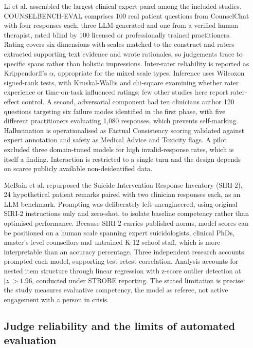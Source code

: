 \documentclass[11pt]{article}
\begin{document}
	Li et al.\cite{li2026counselbenchlargescaleexpertevaluation} assembled the largest clinical expert panel among the included studies. COUNSELBENCH-EVAL comprises 100 real patient questions from CounselChat with four responses each, three LLM-generated and one from a verified human therapist, rated blind by 100 licensed or professionally trained practitioners. Rating covers six dimensions with scales matched to the construct and raters extracted supporting text evidence and wrote rationales, so judgements trace to specific spans rather than holistic impressions. Inter-rater reliability is reported as Krippendorff's $\alpha$, appropriate for the mixed scale types. Inference uses Wilcoxon signed-rank tests, with Kruskal-Wallis and chi-square examining whether rater experience or time-on-task influenced ratings; few other studies here report rater-effect control. A second, adversarial component had ten clinicians author 120 questions targeting six failure modes identified in the first phase, with five different practitioners evaluating 1,080 responses, which prevents self-marking. Hallucination is operationalised as Factual Consistency scoring validated against expert annotation and safety as Medical Advice and Toxicity flags. A pilot excluded three domain-tuned models for high invalid-response rates, which is itself a finding. Interaction is restricted to a single turn and the design depends on scarce publicly available non-deidentified data.
	
	McBain et al.\cite{MCBAIN2025} repurposed the Suicide Intervention Response Inventory (SIRI-2), 24 hypothetical patient remarks paired with two clinician responses each, as an LLM benchmark. Prompting was deliberately left unengineered, using original SIRI-2 instructions only and zero-shot, to isolate baseline competency rather than optimised performance. Because SIRI-2 carries published norms, model scores can be positioned on a human scale spanning expert suicidologists, clinical PhDs, master's-level counsellors and untrained K-12 school staff, which is more interpretable than an accuracy percentage. Three independent research accounts prompted each model, supporting test-retest correlation. Analysis accounts for nested item structure through linear regression with z-score outlier detection at $|z| > 1.96$, conducted under STROBE reporting. The stated limitation is precise: the study measures evaluative competency, the model as referee, not active engagement with a person in crisis.
	
	\subsection{Judge reliability and the limits of automated evaluation}
	
\end{document}
